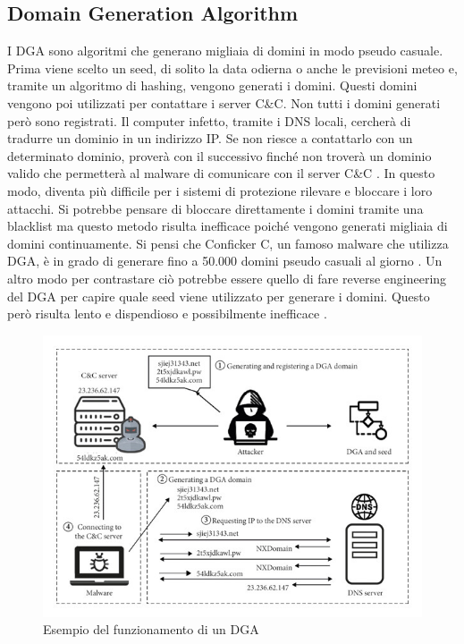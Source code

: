 \documentclass[12pt,a4paper,openright,twoside]{book}
\begin{document}
\subsection{Domain Generation Algorithm}

I \acrshort{DGA} sono algoritmi che generano migliaia di domini in modo pseudo casuale.
Prima viene scelto un seed, di solito la data odierna
o anche le previsioni meteo \cite{8621875} e, tramite
un algoritmo di hashing, vengono generati i domini.
Questi domini vengono poi utilizzati per contattare i server \acrshort{C&C}.
Non tutti i domini generati però sono registrati.
Il computer infetto, tramite i DNS locali, cercherà di tradurre
un dominio in un indirizzo IP.
Se non riesce a contattarlo con un determinato dominio,
proverà con il successivo finché non troverà
un dominio valido che permetterà al malware di comunicare con
il server \acrshort{C&C} \cite{8489147}.
In questo modo, diventa più difficile per i sistemi di protezione
rilevare e bloccare i loro attacchi.
Si potrebbe pensare di bloccare direttamente i domini tramite
una blacklist ma questo metodo
risulta inefficace poiché vengono generati migliaia di domini
continuamente. Si pensi che Conficker C, un famoso malware
che utilizza \acrshort{DGA}, è in grado di generare
fino a 50.000 domini pseudo casuali al giorno \cite{978131}.
Un altro modo per contrastare ciò
potrebbe essere quello di fare reverse engineering
del \acrshort{DGA} per capire quale seed viene utilizzato per generare i domini.
Questo però risulta lento e dispendioso e possibilmente inefficace \cite{8887881}.

\begin{figure}[H]
    \centering
    \includegraphics[width=.8\linewidth]{figures/DGA example.jpg}
    \caption{Esempio del funzionamento di un \acrshort{DGA} \cite{8887881}}
    \label{fig:DGA example}
\end{figure}
\end{document}
